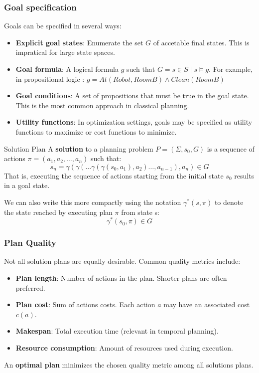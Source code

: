 \documentclass[a4paper]{article}
\theoremstyle{definition}
\begin{document}
\subsubsection{Goal specification}
Goals can be specified in several ways:
\begin{itemize}
    \item \textbf{Explicit goal states}: Enumerate the set \( G \) of accetable final states.
        This is impratical for large state spaces.
    \item \textbf{Goal formula}: A logical formula \( g \) such that 
        \( G = {s \in S \;|\; s \models g}\). For example, in propositional 
        logic : \( g = At(Robot,RoomB)\wedge Clean(RoomB) \)
    \item \textbf{Goal conditions}: A set of propositions that must be true in the goal state.
        This is the most common approach in classical planning.
    \item \textbf{Utility functions}: In optimization settings, goals may be specified as utility 
        functions to maximize or cost functions to minimize.
\end{itemize}
\begin{definition}{Solution Plan}
A \textbf{solution} to a planning problem \( P = (\Sigma,s_0,G) \) is a 
sequence of actions \( \pi = (a_1,a_2,\ldots,a_n) \) such that:
\[
  s_n = \gamma(\gamma(\ldots \gamma(\gamma(s_0,a_1),a_2)\ldots, a_{n-1}),a_n)\in G
\]
That is, executing the sequence of actions starting from the initial state \( s_0 \) results in a goal state.
\end{definition}
We can also write this more compactly using the notation \( \gamma^*(s,\pi) \) to denote
the state reached by executing plan \( \pi \) from state s:
\[
  \gamma^*(s_0,\pi) \in G
\]
\subsubsection{Plan Quality}
Not all solution plans are equally desirable. Common quality metrics include:
\begin{itemize}
    \item \textbf{Plan length}: Number of actions in the plan. Shorter plans are often preferred.
    \item \textbf{Plan cost}: Sum of actions costs. Each action \( a \) may have an associated cost \( c(a) \).
    \item \textbf{Makespan}: Total execution time (relevant in temporal planning).
    \item \textbf{Resource consumption}: Amount of resources used during execution.
\end{itemize}
An \textbf{optimal plan} minimizes the chosen quality metric among all solutions plans.
\end{document}

